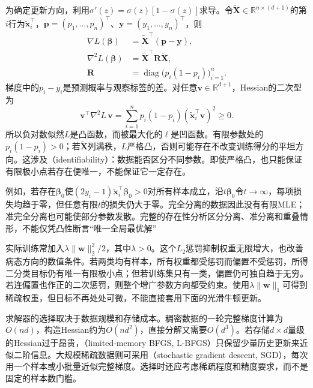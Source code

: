 为确定更新方向，利用$\sigma'(z)=\sigma(z)[1-\sigma(z)]$求导。令$\tilde{\bm{X}}\in\mathbb{R}^{n\times(d+1)}$的第$i$行为$\tilde{\bm{x}}_i^{\top}$，$\bm{p}=(p_1,\ldots,p_n)^{\top}$、$\bm{y}=(y_1,\ldots,y_n)^{\top}$，则
\begin{equation}
  \label{eq:classification-logistic-derivatives}
  \begin{aligned}
    \nabla L(\bm{\beta})
      &=\tilde{\bm{X}}^{\top}(\bm{p}-\bm{y}),\\
    \nabla^2 L(\bm{\beta})
      &=\tilde{\bm{X}}^{\top}\bm{R}\tilde{\bm{X}},\\
    \bm{R}
      &=\operatorname{diag}\bigl(p_i(1-p_i)\bigr)_{i=1}^{n}.
  \end{aligned}
\end{equation}
梯度中的$p_i-y_i$是预测概率与观察标签的差。对任意$\bm{v}\in\mathbb{R}^{d+1}$，Hessian的二次型为
\[
  \bm{v}^{\top}\nabla^2L\,\bm{v}
  =\sum_{i=1}^{n}p_i(1-p_i)
    (\tilde{\bm{x}}_i^{\top}\bm{v})^2\geq0.
\]
所以负对数似然$L$是凸函数，而被最大化的$\ell$是凹函数。有限参数处的$p_i(1-p_i)>0$；若$\tilde{\bm{X}}$列满秩，$L$严格凸，否则可能存在不改变训练得分的平坦方向。这涉及（identifiability）：数据能否区分不同参数。即使严格凸，也只能保证有限极小点若存在便唯一，不能保证它一定存在。

例如，若存在$\bm{\beta}_0$使$(2y_i-1)\tilde{\bm{x}}_i^{\top}\bm{\beta}_0>0$对所有样本成立，沿$t\bm{\beta}_0$令$t\to\infty$，每项损失均趋于零，但任意有限$t$的损失仍大于零。完全分离的数据因此没有有限MLE；准完全分离也可能使部分参数发散。完整的存在性分析区分分离、准分离和重叠情形，不能仅凭凸性断言“唯一全局最优解”

实际训练常加入$\lambda\lVert\bm{w}\rVert_2^2/2$，其中$\lambda>0$。这个$L_2$惩罚抑制权重无限增大，也改善病态方向的数值条件。若两类均有样本，所有权重都受惩罚而偏置不受惩罚，所得二分类目标仍有唯一有限极小点；但若训练集只有一类，偏置仍可独自趋于无穷。若连偏置也作正的二次惩罚，则整个增广参数方向都受约束。使用$\lambda\lVert\bm{w}\rVert_1$可得到稀疏权重，但目标不再处处可微，不能直接套用下面的光滑牛顿更新。

求解器的选择取决于数据规模和存储成本。稠密数据的一轮完整梯度计算为$O(nd)$，构造Hessian约为$O(nd^2)$，直接分解又需要$O(d^3)$。若存储$d\times d$量级的Hessian过于昂贵，（limited-memory BFGS, L-BFGS）只保留少量历史更新来近似二阶信息。大规模稀疏数据则可采用（stochastic gradient descent, SGD），每次用一个样本或小批量近似完整梯度。选择时还应考虑稀疏程度和精度要求，而不是固定的样本数门槛。

